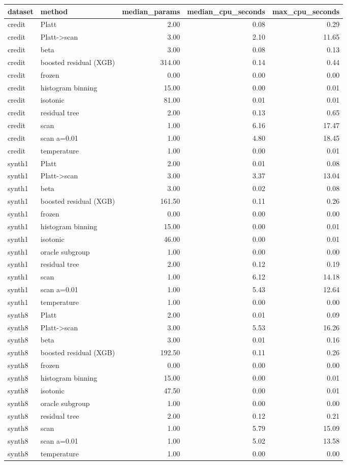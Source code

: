 \begin{tabular}{llrrr}
\toprule
dataset & method & median_params & median_cpu_seconds & max_cpu_seconds \\
\midrule
credit & Platt & 2.00 & 0.08 & 0.29 \\
credit & Platt->scan & 3.00 & 2.10 & 11.65 \\
credit & beta & 3.00 & 0.08 & 0.13 \\
credit & boosted residual (XGB) & 314.00 & 0.14 & 0.44 \\
credit & frozen & 0.00 & 0.00 & 0.00 \\
credit & histogram binning & 15.00 & 0.00 & 0.01 \\
credit & isotonic & 81.00 & 0.01 & 0.01 \\
credit & residual tree & 2.00 & 0.13 & 0.65 \\
credit & scan & 1.00 & 6.16 & 17.47 \\
credit & scan a=0.01 & 1.00 & 4.80 & 18.45 \\
credit & temperature & 1.00 & 0.00 & 0.01 \\
synth1 & Platt & 2.00 & 0.01 & 0.08 \\
synth1 & Platt->scan & 3.00 & 3.37 & 13.04 \\
synth1 & beta & 3.00 & 0.02 & 0.08 \\
synth1 & boosted residual (XGB) & 161.50 & 0.11 & 0.26 \\
synth1 & frozen & 0.00 & 0.00 & 0.00 \\
synth1 & histogram binning & 15.00 & 0.00 & 0.01 \\
synth1 & isotonic & 46.00 & 0.00 & 0.01 \\
synth1 & oracle subgroup & 1.00 & 0.00 & 0.00 \\
synth1 & residual tree & 2.00 & 0.12 & 0.19 \\
synth1 & scan & 1.00 & 6.12 & 14.18 \\
synth1 & scan a=0.01 & 1.00 & 5.43 & 12.64 \\
synth1 & temperature & 1.00 & 0.00 & 0.00 \\
synth8 & Platt & 2.00 & 0.01 & 0.09 \\
synth8 & Platt->scan & 3.00 & 5.53 & 16.26 \\
synth8 & beta & 3.00 & 0.01 & 0.16 \\
synth8 & boosted residual (XGB) & 192.50 & 0.11 & 0.26 \\
synth8 & frozen & 0.00 & 0.00 & 0.00 \\
synth8 & histogram binning & 15.00 & 0.00 & 0.01 \\
synth8 & isotonic & 47.50 & 0.00 & 0.01 \\
synth8 & oracle subgroup & 1.00 & 0.00 & 0.00 \\
synth8 & residual tree & 2.00 & 0.12 & 0.21 \\
synth8 & scan & 1.00 & 5.79 & 15.09 \\
synth8 & scan a=0.01 & 1.00 & 5.02 & 13.58 \\
synth8 & temperature & 1.00 & 0.00 & 0.00 \\
\bottomrule
\end{tabular}
